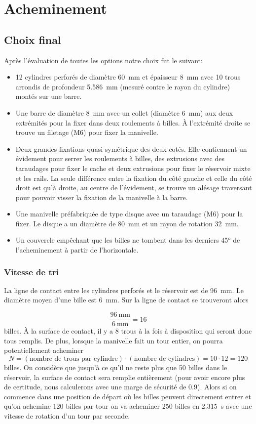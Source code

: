 \section{Acheminement}
\subsection{Choix final}
Après l'évaluation de toutes les options notre choix fut le suivant:
\begin{itemize}
	\item \num{12} cylindres perforés de diamètre \SI{60}{\milli\metre} et épaisseur \SI{8}{\milli\metre} avec \num{10} trous arrondis de profondeur \SI{5.586}{\milli\metre} (mesuré contre le rayon du cylindre) montés sur une barre.
	\item Une barre de diamètre \SI{8}{\milli\metre} avec un collet (diamètre \SI{6}{\milli\metre}) aux deux extrémités pour la fixer dans deux roulements à billes. À l'extrémité droite se trouve un filetage (M6) pour fixer la manivelle.
	\item Deux grandes fixations quasi-symétrique des deux cotés. Elle contiennent un évidement pour serrer les roulements à billes, des extrusions avec des taraudages pour fixer le cache et deux extrusions pour fixer le réservoir mixte et les rails. La seule différence entre la fixation du côté gauche et celle du côté droit est qu'à droite, au centre de l'évidement, se trouve un alésage traversant pour pouvoir visser la fixation de la manivelle à la barre.
	\item Une manivelle préfabriquée de type disque avec un taraudage (M6) pour la fixer. Le disque a un diamètre de \SI{80}{\milli\metre} et un rayon de rotation  \SI{32}{\milli\metre}.
	\item Un couvercle empêchant que les billes ne tombent dans les derniers \ang{45} de l'acheminement à partir de l'horizontale.
\end{itemize}


\subsubsection{Vitesse de tri}
La ligne de contact entre les cylindres perforés et le réservoir est de \SI{96}{\milli\metre}. Le diamètre moyen d'une bille est \SI{6}{\milli\metre}. Sur la ligne de contact se trouveront alors

\[\frac{\SI{96}{\milli\metre}}{\SI{6}{\milli\metre}} = \num{16}\]
billes. À la surface de contact, il y a \num{8} trous à la fois à disposition qui seront donc tous remplis. De plus, lorsque la manivelle fait un tour entier, on pourra potentiellement acheminer 
\[N = (\text{nombre de trous par cylindre}) \cdot (\text{nombre de cylindres}) = \num{10} \cdot \num{12} = \num{120}\]
billes.
On considère que jusqu'à ce qu'il ne reste plus que \num{50} billes dans le réservoir, la surface de contact sera remplie entièrement (pour avoir encore plus de certitude, nous calculerons avec une marge de sécurité de \num{0.9}).
Alors si on commence dans une position de départ où les billes peuvent directement entrer et qu'on achemine \num{120} billes par tour on va acheminer \num{250} billes en \SI{2.315}{\s} avec une vitesse de rotation d'un tour par seconde.

